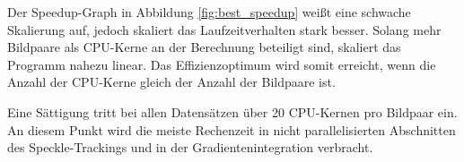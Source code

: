 Der Speedup-Graph in Abbildung \ref{fig:best_speedup} weißt eine schwache Skalierung auf, jedoch skaliert das Laufzeitverhalten stark besser. Solang mehr Bildpaare als \gls{CPU}-Kerne an der Berechnung beteiligt sind, skaliert das Programm nahezu linear. Das Effizienzoptimum wird somit erreicht, wenn die Anzahl der \gls{CPU}-Kerne gleich der Anzahl der Bildpaare ist. 

Eine Sättigung tritt bei allen Datensätzen über 20 \gls{CPU}-Kernen pro Bildpaar ein. An diesem Punkt wird die meiste Rechenzeit in nicht parallelisierten Abschnitten des Speckle-Trackings und in der Gradientenintegration verbracht.